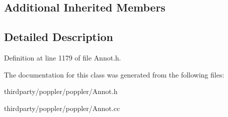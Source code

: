 \subsection*{Additional Inherited Members}


\subsection{Detailed Description}


Definition at line 1179 of file Annot.\+h.



The documentation for this class was generated from the following files\+:\begin{DoxyCompactItemize}
\item 
thirdparty/poppler/poppler/Annot.\+h\item 
thirdparty/poppler/poppler/Annot.\+cc\end{DoxyCompactItemize}
